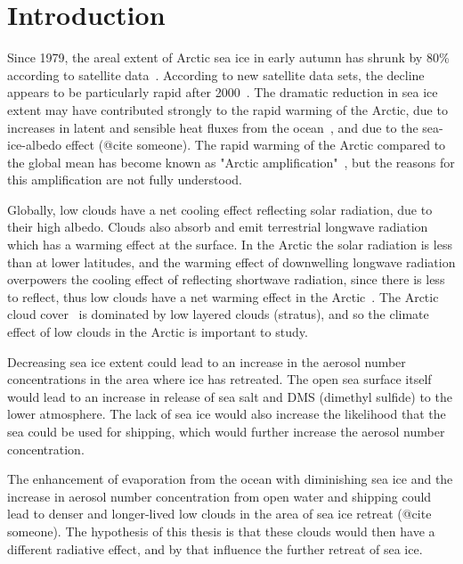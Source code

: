 \chapter{Introduction}
\label{chap:introduction}
Since 1979, the areal extent of Arctic sea ice in early autumn has shrunk by 80\% according to satellite data~\citep{NSIDC}. According to new satellite data sets, the decline appears to be particularly rapid after 2000~\citep{Wu2012}. The dramatic reduction in sea ice extent may have contributed strongly to the rapid warming of the Arctic, due to increases in latent and sensible heat fluxes from the ocean~\citep{Screen2010}, and due to the sea-ice-albedo effect (@cite someone). The rapid warming of the Arctic compared to the global mean has become known as "Arctic amplification"~\citep{Graversen2008}, but the reasons for this amplification are not fully understood.

Globally, low clouds have a net cooling effect reflecting solar radiation, due to their high albedo. Clouds also absorb and emit terrestrial longwave radiation which has a warming effect at the surface. In the Arctic the solar radiation is less than at lower latitudes, and the warming effect of downwelling longwave radiation overpowers the cooling effect of reflecting shortwave radiation, since there is less to reflect, thus low clouds have a net warming effect in the Arctic~\citep{Shupe2004}. The Arctic cloud cover~\citep{Curry1996} is dominated by low layered clouds (stratus), and so the climate effect of low clouds in the Arctic is important to study.

Decreasing sea ice extent could lead to an increase in the aerosol number concentrations in the area where ice has retreated. The open sea surface itself would lead to an increase in release of sea salt and DMS (dimethyl sulfide) to the lower atmosphere. The lack of sea ice would also increase the likelihood that the sea could be used for shipping, which would further increase the aerosol number concentration.

The enhancement of evaporation from the ocean with diminishing sea ice and the increase in aerosol number concentration from open water and shipping could lead to denser and longer-lived low clouds in the area of sea ice retreat (@cite someone). The  hypothesis of this thesis is that these clouds would then have a different radiative effect, and by that influence the further retreat of sea ice.



